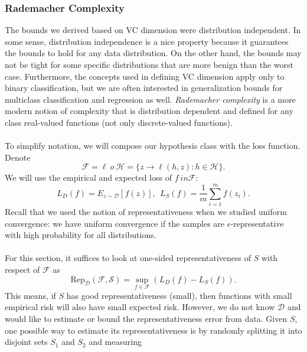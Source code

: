 \documentclass{article}
\begin{document}
   \subsubsection{Rademacher Complexity}
   The bounds we derived based on VC dimension were distribution independent. In some sense, distribution independence is a nice property because it guarantees the bounds to hold for any data distribution. On the other hand, the bounds may not be tight for some specific distributions that are more benign than the worst case. Furthermore, the concepts used in defining VC dimension apply only to binary classification, but we are often interested in generalization bounds for multiclass classification and regression as well. \textit{Rademacher complexity} is a more modern notion of complexity that is distribution dependent and defined for any class real-valued functions (not only discrete-valued functions).
   \\\\
   To simplify notation, we will compose our hypothesis class with the loss function. Denote
   \begin{equation}
   \mathcal{F} = \ell\ o\ \mathcal{H} = \{ z \rightarrow \ell(h,z):h \in \mathcal{H} \}.
   \end{equation}
   We will use the empirical and expected loss of $f \ in \mathcal{F}$:
   \begin{equation}
   L_D(f) = E_{z \sim \mathcal{D}}[f(z)], \ \ L_S(f) = \frac{1}{m} \sum_{i=1}^m f(z_i).
   \end{equation}
   Recall that we used the notion of representativeness when we studied uniform convergence: we have uniform convergence if the samples are $\epsilon$-representative with high probability for all distributions.
   \\\\
   For this section, it suffices to look at one-sided representativeness of $S$ with respect of $\mathcal{F}$ as 
   \begin{equation}
   \text{Rep}_\mathcal{D} (\mathcal{F}, \mathcal{S}) = \sup_{f \in \mathcal{F}} (L_D(f) - L_S(f)). 
   \end{equation}
   This means, if $S$ has good representativeness (small), then functions with small empirical risk will also have small expected risk. However, we do not know $ \mathcal{D}$ and would like to estimate or bound the representativeness error from data. Given $S$, one possible way to estimate its representativeness is by randomly splitting it into disjoint sets $S_1$ and $S_2$ and measuring
\end{document}
